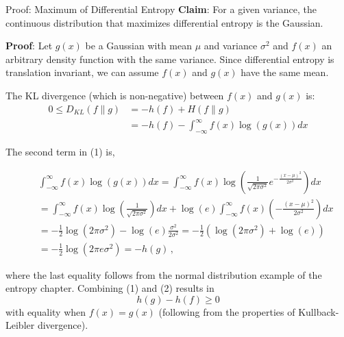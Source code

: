 \documentclass[11pt,compress,t,notes=noshow, xcolor=table]{beamer}
\begin{document}
\begin{vbframe}{Proof: Maximum of Differential Entropy}
  \textbf{Claim}: For a given variance, the continuous distribution that maximizes differential entropy is the Gaussian.

  \lz

  \textbf{Proof}: Let $g(x)$ be a Gaussian with mean $\mu$ and variance $\sigma^2$ and $f(x)$ an arbitrary density function with the same variance. Since differential entropy is translation invariant, we can assume $f(x)$ and $g(x)$ have the same mean.

  \lz
  
  The KL divergence (which is non-negative) between $f(x)$ and $g(x)$ is:
  \begin{equation}
    \begin{aligned}
       0 \leq D_{KL}(f \| g) & = -h(f) + H(f \| g) \\
                             & =-h(f)-\int_{-\infty}^{\infty} f(x) \log (g(x)) dx
    \end{aligned}
  \end{equation}
  
  \framebreak
  
The second term in (1) is, 
  
\begin{footnotesize}
\begin{eqnarray}
& & \int_{-\infty}^{\infty} f(x) \log (g(x)) d x =\int_{-\infty}^{\infty} f(x) \log \left(\frac{1}{\sqrt{2 \pi \sigma^{2}}} e^{-\frac{(x-\mu)^{2}}{2 \sigma^{2}}}\right) d x \nonumber\\ 
& &=\int_{-\infty}^{\infty} f(x) \log \left(\frac{1}{\sqrt{2 \pi \sigma^{2}}}\right) d x+\log (e) \int_{-\infty}^{\infty} f(x)\left(-\frac{(x-\mu)^{2}}{2 \sigma^{2}}\right) d x \nonumber\\ 
& &= -\frac{1}{2} \log \left(2 \pi \sigma^{2}\right)-\log (e) \frac{\sigma^{2}}{2 \sigma^{2}} = -\frac{1}{2} (\log \left(2 \pi \sigma^{2}\right)+\log (e) ) \nonumber\\ 
& &=-\frac{1}{2} \log \left(2 \pi e \sigma^{2}\right) = -h(g) \,,
\end{eqnarray}
\end{footnotesize}

where the last equality follows from the normal distribution example of the entropy chapter. Combining (1) and (2) results in
$$h(g) - h(f) \geq 0$$
with equality when $f(x) = g(x)$ (following from the properties of Kullback-Leibler divergence).
\end{vbframe}
\end{document}
